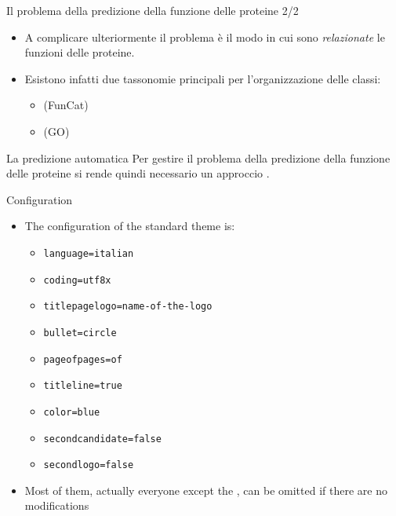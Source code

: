 \documentclass{beamer}
\begin{document}
\begin{tframe}{\small Il problema della predizione della funzione delle proteine 2/2}
\begin{itemize}
\item A complicare ulteriormente il problema è il modo in cui sono \emph{relazionate} le funzioni delle proteine.
\item Esistono infatti due tassonomie principali per l'organizzazione delle classi:
\begin{itemize}
\item {} (FunCat)
\item {} (GO)
\end{itemize}
\end{itemize}  

\end{tframe}

\begin{tframe}{La predizione automatica}
Per gestire il problema della predizione della funzione delle proteine si rende quindi necessario un approccio .

\end{tframe}


\begin{frame}[t,fragile]{Configuration}
\begin{itemize}
\item The configuration of the standard theme is:
\begin{itemize}
\item \verb!language=italian!
\item \verb!coding=utf8x!
\item \verb!titlepagelogo=name-of-the-logo!
\item \verb!bullet=circle!
\item \verb!pageofpages=of!
\item \verb!titleline=true!
\item \verb!color=blue!
\item \verb!secondcandidate=false!
\item \verb!secondlogo=false!
\end{itemize}
\item Most of them, actually everyone except the , can be omitted if there are no modifications
\end{itemize}
\end{frame}
\end{document}
